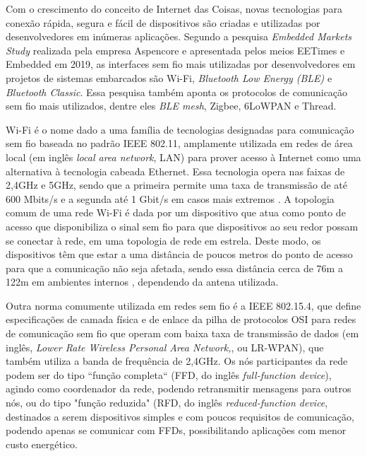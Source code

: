 \documentclass[../monografia.tex]{subfiles}
\begin{document}
Com o crescimento do conceito de Internet das Coisas, novas tecnologias para conexão rápida, segura e fácil de dispositivos são criadas e utilizadas por desenvolvedores em inúmeras aplicações. Segundo a pesquisa \textit{Embedded Markets Study} realizada pela empresa Aspencore\cite{embedded-market-study} e apresentada pelos meios EETimes\cite{eetimes} e Embedded\cite{embedded} em 2019, as interfaces sem fio mais utilizadas por desenvolvedores em  projetos de sistemas embarcados são Wi-Fi, \textit{Bluetooth Low Energy (BLE)} e \textit{Bluetooth Classic}. Essa pesquisa também aponta os protocolos de comunicação sem fio mais utilizados, dentre eles \textit{BLE mesh}, Zigbee, 6LoWPAN e Thread. 

Wi-Fi é o nome dado a uma família de tecnologias designadas para comunicação sem fio baseada no padrão IEEE 802.11\cite{802.11}, amplamente utilizada em redes de área local (em inglês \textit{local area network}, LAN) para prover acesso à Internet como uma alternativa à tecnologia cabeada Ethernet. Essa tecnologia opera nas faixas de 2,4GHz e 5GHz, sendo que a primeira permite uma taxa de transmissão de até 600 Mbits/s e a segunda até 1 Gbit/s em casos mais extremos \cite{Wi-Fi-datarate}. A topologia comum de uma rede Wi-Fi é dada por um  dispositivo que atua como ponto de acesso que disponibiliza o sinal sem fio para que dispositivos ao seu redor possam se conectar à rede, em uma topologia de rede em estrela. Deste modo, os dispositivos têm que estar a uma distância de poucos metros do ponto de acesso para que a comunicação não seja afetada, sendo essa distância cerca de 76m a 122m em ambientes internos \cite{wifi-range}, dependendo da antena utilizada.

Outra norma comumente utilizada em redes sem fio é a IEEE 802.15.4, que define especificações de camada física e de enlace da pilha de protocolos OSI para redes de comunicação sem fio que operam com baixa taxa de transmissão de dados (em inglês, \textit{Lower Rate Wireless Personal Area Network,}, ou LR-WPAN), que também utiliza a banda de frequência de 2,4GHz\cite{802.15.4}. Os nós participantes da rede podem ser do tipo ``função completa`` (FFD, do inglês \textit{full-function device}), agindo como coordenador da rede, podendo retransmitir mensagens para outros nós, ou do tipo "função reduzida" (RFD, do inglês \textit{reduced-function device}, destinados a serem dispositivos simples e com poucos requisitos de comunicação, podendo apenas se comunicar com FFDs, possibilitando aplicações com menor custo energético. 
\end{document}
